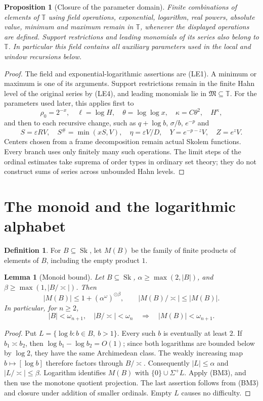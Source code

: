 \documentclass[11pt]{article}
\newtheorem{lemma}[theorem]{Lemma}
\newtheorem{proposition}[theorem]{Proposition}
\theoremstyle{definition}
\newtheorem{definition}[theorem]{Definition}
\theoremstyle{remark}
\newcommand{\Sk}{\operatorname{Sk}}
\newcommand{\T}{\mathbb T}
\newcommand{\arch}{\mathrel{\asymp}}
\newcommand{\od}{\mathbin{\odot}}
\numberwithin{equation}{section}
\begin{document}
\begin{proposition}[Closure of the parameter domain]\label{sf:prop:parameters}
Finite combinations of elements of $\T$ using field operations,
exponential, logarithm, real powers, absolute value, minimum and
maximum remain in $\T$, whenever the displayed operations are
defined. Support restrictions and leading monomials of its series
also belong to $\T$. In particular this field contains all
auxiliary parameters used in the local and window recursions below.
\end{proposition}
\begin{proof}
The field and exponential-logarithmic assertions are (LE1).
A minimum or maximum is one of its arguments. Support restrictions
remain in the finite Hahn level of the original series by (LE4),
and leading monomials lie in $\mathfrak M\subseteq\T$.
For the parameters used later, this applies first to
\[
 \rho_0=2^{-x},\quad \ell=\log H,\quad
 \theta=\log\log x,\quad \kappa=C\theta^2,\quad H^\kappa,
\]
and then to each recursive change, such as
$q+\log b$, $\sigma/b$, $e^{-p}$ and
\[
 S=\varepsilon RV,\quad S^\#=\min(xS,V),\quad
 \eta=\varepsilon V/D,\quad
 Y=e^{-p-z}V,\quad Z=e^zV.
\]
Centers chosen from a frame decomposition remain actual Skolem
functions. Every branch uses only finitely many such operations.
The limit steps of the ordinal estimates take suprema of order
types in ordinary set theory; they do not construct sums of series
across unbounded Hahn levels.
\end{proof}

\section{The monoid and the logarithmic alphabet}

\begin{definition}
For $B\subseteq\Sk$, let $M(B)$ be the family of finite products of
elements of $B$, including the empty product $1$.
\end{definition}

\begin{lemma}[Monoid bound]\label{g-lem:monoid}
Let $B\subseteq\Sk$,
$\alpha\ge\max(2,|B|)$, and $\beta\ge\max(1,|B/\arch|)$.
Then
\[
 |M(B)|\le 1+(\alpha^\omega)^{\od\beta},\qquad
 |M(B)/\arch|\le |M(B)|.
\]
In particular, for $n\ge2$,
\[
 |B|<\omega_{n+1},\quad |B/\arch|<\omega_n
 \quad\Longrightarrow\quad |M(B)|<\omega_{n+1}.
\]
\end{lemma}
\begin{proof}
Put $L=\{\log b:b\in B,\ b>1\}$.  Every such $b$ is eventually
at least $2$.  If $b_1\arch b_2$, then
$\log b_1-\log b_2=O(1)$; since both logarithms are bounded below by
$\log2$, they have the same Archimedean class.  The weakly increasing
map $b\mapsto[\log b]$ therefore factors through $B/\arch$.
Consequently $|L|\le\alpha$ and $|L/\arch|\le\beta$.
Logarithm identifies $M(B)$ with $\{0\}\cup\Sigma^+L$.
Apply (BM3), and then use the monotone quotient projection.
The last assertion follows from (BM3) and closure under addition of
smaller ordinals.  Empty $L$ causes no difficulty.
\end{proof}
\end{document}
